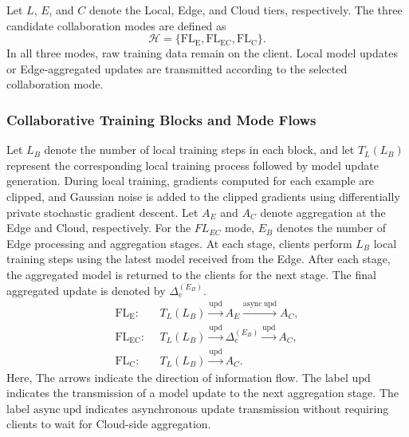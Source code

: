 \documentclass[5p,times]{elsarticle}
\theoremstyle{plain}
\theoremstyle{definition}
\theoremstyle{remark}
\begin{document}
	Let \(L\), \(E\), and \(C\) denote the Local, Edge,
	and Cloud tiers, respectively. The three candidate
	collaboration modes are defined as
	\begin{equation}
		\mathcal H =
		\{\mathrm{FL_E},\mathrm{FL_{EC}},\mathrm{FL_C}\}.
		\label{eq:three_modes}
	\end{equation}
	In all three modes, raw training data remain on
	the client. Local model updates or Edge-aggregated
	updates are transmitted according to the selected
	collaboration mode.
	
	
	\subsubsection{Collaborative Training Blocks and Mode Flows}
	
	Let \(L_B\) denote the number of local training
	steps in each block, and let \(T_L(L_B)\) represent
	the corresponding local training process followed
	by model update generation.
	During local training, 
	gradients computed for each example are clipped, 
	and Gaussian noise is added to the clipped gradients using differentially private stochastic gradient descent.
	Let \(A_E\) and \(A_C\)
	denote aggregation at the Edge and Cloud,
	respectively.
	For the \(FL_{EC}\) mode, \(E_B\) denotes
	the number of Edge processing and aggregation
	stages. At each stage, clients perform
	\(L_B\) local training steps using the latest
	model received from the Edge. After each
	stage, the aggregated model is returned to
	the clients for the next stage. The final
	aggregated update is denoted by
	\(\Delta_e^{(E_B)}\).
	\begin{equation}
		\begin{aligned}
			\mathrm{FL_E}:~~&
			T_L(L_B)
			\xrightarrow{\mathrm{upd}} A_E
			\xrightarrow{\mathrm{async\ upd}} A_C,\\
			\mathrm{FL_{EC}}:~~&
			T_L(L_B)
			\xrightarrow{\mathrm{upd}} \Delta_e^{(E_B)}
			\xrightarrow{\mathrm{upd}} A_C,\\
			\mathrm{FL_C}:~~&
			T_L(L_B)
			\xrightarrow{\mathrm{upd}} A_C.
		\end{aligned}
		\label{eq:mode_flows}
	\end{equation}
	Here, The arrows indicate the direction of information flow.
	The label \(\mathrm{upd}\) indicates the transmission
	of a model update to the next aggregation stage.
	The label \(\mathrm{async\ upd}\) indicates
	asynchronous update transmission without requiring
	clients to wait for Cloud-side aggregation.
	
\end{document}
